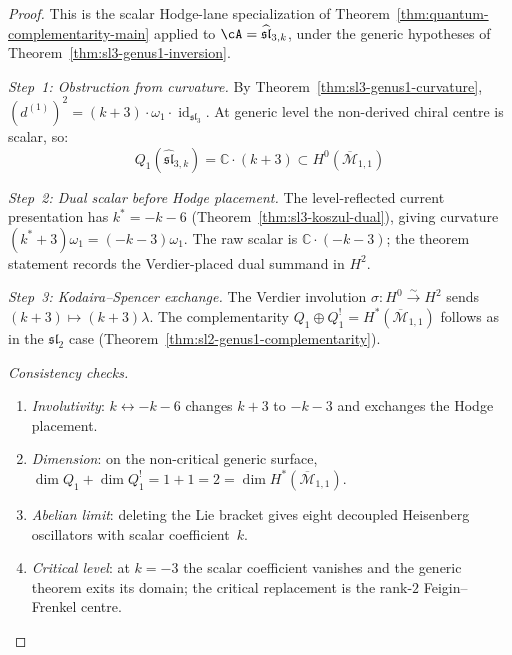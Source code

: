 \begin{proof}
This is the scalar Hodge-lane specialization of
Theorem~\ref{thm:quantum-complementarity-main} applied to
$\cA = \widehat{\mathfrak{sl}}_{3,k}$, under the generic hypotheses of
Theorem~\ref{thm:sl3-genus1-inversion}.

\emph{Step~1: Obstruction from curvature.}
By Theorem~\ref{thm:sl3-genus1-curvature},
$(d^{(1)})^2 = (k+3) \cdot \omega_1 \cdot
\operatorname{id}_{\mathfrak{sl}_3}$. At generic level the
non-derived chiral centre is scalar, so:
\begin{equation}
Q_1(\widehat{\mathfrak{sl}}_{3,k}) = \mathbb{C} \cdot (k+3) \subset H^0(\overline{\mathcal{M}}_{1,1})
\end{equation}

\emph{Step~2: Dual scalar before Hodge placement.}
The level-reflected current presentation has $k^* = -k-6$
(Theorem~\ref{thm:sl3-koszul-dual}), giving curvature
$(k^*+3)\omega_1 = (-k-3)\omega_1$.  The raw scalar is
$\mathbb{C}\cdot(-k-3)$; the theorem statement records the
Verdier-placed dual summand in $H^2$.

\emph{Step~3: Kodaira--Spencer exchange.}
The Verdier involution $\sigma\colon H^0 \xrightarrow{\sim} H^2$ sends $(k+3) \mapsto (k+3)\lambda$. The complementarity $Q_1 \oplus Q_1^! = H^*(\overline{\mathcal{M}}_{1,1})$ follows as in the $\mathfrak{sl}_2$ case (Theorem~\ref{thm:sl2-genus1-complementarity}).

\emph{Consistency checks.}
\begin{enumerate}
\item \emph{Involutivity}: $k \leftrightarrow -k-6$ changes
 $k+3$ to $-k-3$ and exchanges the Hodge placement.
\item \emph{Dimension}: on the non-critical generic surface,
 $\dim Q_1 + \dim Q_1^! = 1+1 = 2 =
 \dim H^*(\overline{\mathcal{M}}_{1,1})$.
\item \emph{Abelian limit}: deleting the Lie bracket gives eight
 decoupled Heisenberg oscillators with scalar coefficient~$k$.
\item \emph{Critical level}: at $k=-3$ the scalar coefficient
 vanishes and the generic theorem exits its domain; the critical
 replacement is the rank-$2$ Feigin--Frenkel centre.
\end{enumerate}
\end{proof}

